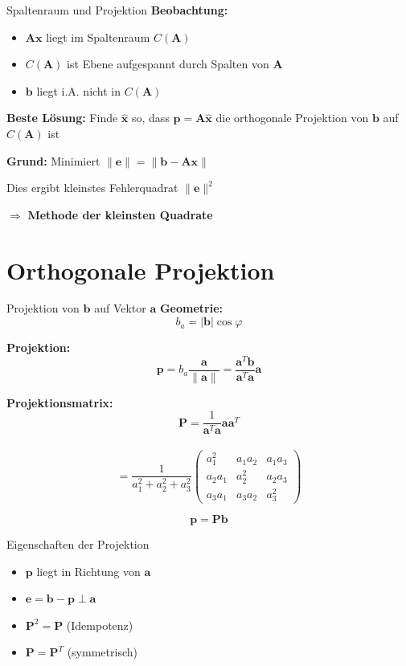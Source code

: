 \documentclass[a4paper, fontsize=7pt]{scrartcl}
\begin{document}
\begin{mainbox}{Spaltenraum und Projektion}
\textbf{Beobachtung:}
\begin{itemize}
    \item $\mathbf{Ax}$ liegt im Spaltenraum $C(\mathbf{A})$
    \item $C(\mathbf{A})$ ist Ebene aufgespannt durch Spalten von $\mathbf{A}$
    \item $\mathbf{b}$ liegt i.A. nicht in $C(\mathbf{A})$
\end{itemize}

\textbf{Beste Lösung:}
Finde $\hat{\mathbf{x}}$ so, dass $\mathbf{p} = \mathbf{A}\hat{\mathbf{x}}$ die orthogonale Projektion von $\mathbf{b}$ auf $C(\mathbf{A})$ ist

\textbf{Grund:} Minimiert $\|\mathbf{e}\| = \|\mathbf{b} - \mathbf{Ax}\|$

Dies ergibt kleinstes Fehlerquadrat $\|\mathbf{e}\|^2$

$\Rightarrow$ \textbf{Methode der kleinsten Quadrate}
\end{mainbox}

\section{Orthogonale Projektion}

\begin{mainbox}{Projektion von $\mathbf{b}$ auf Vektor $\mathbf{a}$}
\textbf{Geometrie:}
$$b_a = |\mathbf{b}| \cos\varphi$$

\textbf{Projektion:}
$$\mathbf{p} = b_a \frac{\mathbf{a}}{\|\mathbf{a}\|} = \frac{\mathbf{a}^T\mathbf{b}}{\mathbf{a}^T\mathbf{a}} \mathbf{a}$$

\textbf{Projektionsmatrix:}
$$\mathbf{P} = \frac{1}{\mathbf{a}^T\mathbf{a}} \mathbf{aa}^T$$ \\
$$= \frac{1}{a_1^2 + a_2^2 + a_3^2} \begin{pmatrix} a_1^2 & a_1a_2 & a_1a_3 \\ a_2a_1 & a_2^2 & a_2a_3 \\ a_3a_1 & a_3a_2 & a_3^2 \end{pmatrix}$$

$$\mathbf{p} = \mathbf{Pb}$$
\end{mainbox}

\begin{subbox}{Eigenschaften der Projektion}
\begin{itemize}
    \item $\mathbf{p}$ liegt in Richtung von $\mathbf{a}$
    \item $\mathbf{e} = \mathbf{b} - \mathbf{p} \perp \mathbf{a}$
    \item $\mathbf{P}^2 = \mathbf{P}$ (Idempotenz)
    \item $\mathbf{P} = \mathbf{P}^T$ (symmetrisch)
\end{itemize}
\end{subbox}
\end{document}
